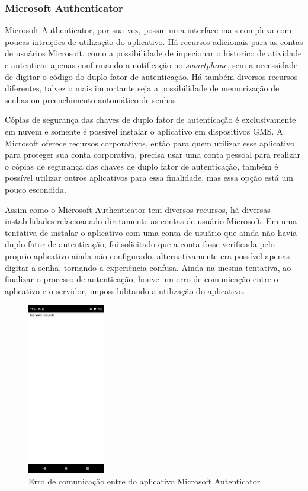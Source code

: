 \documentclass[12pt]{article}
\begin{document}
\subsubsection{Microsoft Authenticator}\label{sec:figs}

Microsoft Authenticator, por sua vez, possui uma interface mais complexa com
poucas intruções de utilização do aplicativo.
Há recursos adicionais para as contas de usuários Microsoft, como a possibilidade de
inpecionar o historico de atividade e autenticar apenas confirmando a notificação
no \textit{smartphone}, sem a necessidade de digitar o código do duplo fator de autenticação.
Há também diversos recursos diferentes, talvez o mais importante seja a possibilidade
de memorização de senhas ou preenchimento automático de senhas.

Cópias de segurança das chaves de duplo fator de autenticação é exclusivamente em
nuvem e somente é possível instalar o aplicativo em dispositivos GMS.
A Microsoft oferece recursos corporativos, então para quem utilizar esse
aplicativo para proteger sua conta corporativa, precisa usar uma conta pessoal
para realizar o cópias de segurança das chaves de duplo fator de autenticação, também
é possível utilizar outros aplicativos para essa finalidade, mas essa opção está um
pouco escondida.

Assim como o Microsoft Authenticator tem diversos recursos, há diversas instabilidades
relacioanado diretamente as contas de usuário Microsoft.
Em uma tentativa de instalar o aplicativo com uma conta de usuário que ainda não havia
duplo fator de autenticação, foi solicitado que a conta fosse verificada pelo proprio
aplicativo ainda não configurado, alternativamente era possível apenas digitar a senha,
tornando a experiência confusa.
Ainda na mesma tentativa, ao finalizar o processo de autenticação, houve um erro de
comunicação entre o aplicativo e o servidor, impossibilitando a utilização do aplicativo.

\begin{figure}[h!]
  \centering
  \includegraphics[width=0.3\textwidth]{./assets/microsoft_error_1.jpg}
  \caption{Erro de comunicação entre do aplicativo Microsoft Autenticator}
  \label{fig:MicrosoftAutenticatorErrorToManyReequests}
\end{figure}
\end{document}

